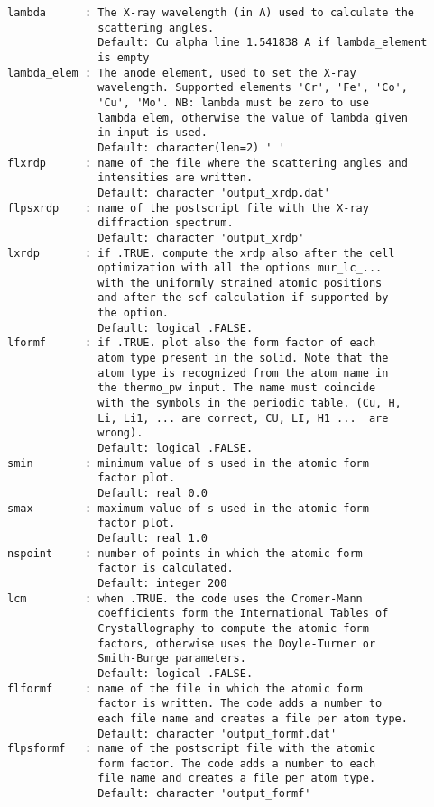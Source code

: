 \documentclass[12pt,a4paper,twoside]{report}
\begin{document}
\begin{verbatim}
lambda      : The X-ray wavelength (in A) used to calculate the 
              scattering angles.
              Default: Cu alpha line 1.541838 A if lambda_element 
              is empty
lambda_elem : The anode element, used to set the X-ray 
              wavelength. Supported elements 'Cr', 'Fe', 'Co', 
              'Cu', 'Mo'. NB: lambda must be zero to use 
              lambda_elem, otherwise the value of lambda given 
              in input is used.
              Default: character(len=2) ' ' 
flxrdp      : name of the file where the scattering angles and 
              intensities are written.
              Default: character 'output_xrdp.dat'
flpsxrdp    : name of the postscript file with the X-ray 
              diffraction spectrum.
              Default: character 'output_xrdp'
lxrdp       : if .TRUE. compute the xrdp also after the cell 
              optimization with all the options mur_lc_... 
              with the uniformly strained atomic positions 
              and after the scf calculation if supported by 
              the option. 
              Default: logical .FALSE.
lformf      : if .TRUE. plot also the form factor of each 
              atom type present in the solid. Note that the 
              atom type is recognized from the atom name in 
              the thermo_pw input. The name must coincide 
              with the symbols in the periodic table. (Cu, H, 
              Li, Li1, ... are correct, CU, LI, H1 ...  are 
              wrong).
              Default: logical .FALSE.
smin        : minimum value of s used in the atomic form 
              factor plot.
              Default: real 0.0
smax        : maximum value of s used in the atomic form 
              factor plot.
              Default: real 1.0
nspoint     : number of points in which the atomic form 
              factor is calculated.
              Default: integer 200
lcm         : when .TRUE. the code uses the Cromer-Mann 
              coefficients form the International Tables of 
              Crystallography to compute the atomic form 
              factors, otherwise uses the Doyle-Turner or 
              Smith-Burge parameters.
              Default: logical .FALSE.
flformf     : name of the file in which the atomic form 
              factor is written. The code adds a number to 
              each file name and creates a file per atom type.
              Default: character 'output_formf.dat'
flpsformf   : name of the postscript file with the atomic 
              form factor. The code adds a number to each 
              file name and creates a file per atom type.
              Default: character 'output_formf'
\end{verbatim}
\end{document}
